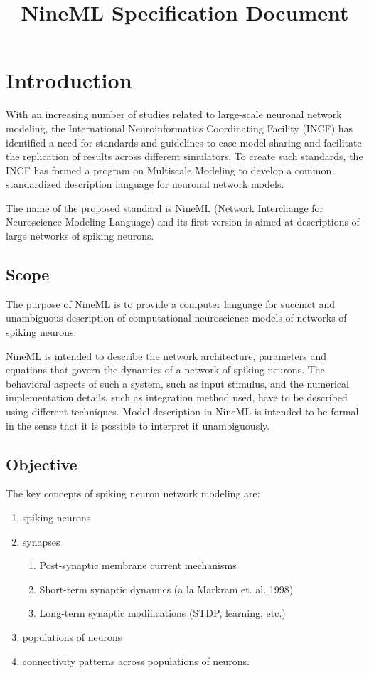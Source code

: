 \documentclass[a4paper]{article}
\begin{document}
\title{NineML Specification Document}

\newpage
\pagestyle{plain}

\tableofcontents

\section{Introduction}

With an increasing number of studies related to large-scale neuronal
network modeling, the International Neuroinformatics Coordinating
Facility (INCF) has identified a need for standards and guidelines to
ease model sharing and facilitate the replication of results across
different simulators. To create such standards, the INCF has formed a
program on Multiscale Modeling to develop a common standardized
description language for neuronal network models.

The name of the proposed standard is NineML (Network Interchange for
Neuroscience Modeling Language) and its first version is aimed at
descriptions of large networks of spiking neurons.

\subsection{Scope}

The purpose of NineML is to provide a computer language for
succinct and unambiguous description of computational neuroscience models of
networks of spiking neurons.

NineML is intended to describe the network architecture, parameters
and equations that govern the dynamics of a network of spiking
neurons. The behavioral aspects of such a system, such as input
stimulus, and the numerical implementation details, such as
integration method used, have to be described using different
techniques.  Model description in NineML is intended to be formal in
the sense that it is possible to interpret it unambiguously.

\subsection{Objective}

The key concepts of spiking neuron network modeling are:

\begin{enumerate}
\item spiking neurons
\item synapses 
\begin{enumerate}
\item Post-synaptic membrane current mechanisms
\item Short-term synaptic dynamics (a la Markram et. al. 1998)
\item Long-term synaptic modifications (STDP, learning, etc.)
\end{enumerate}
\item populations of neurons 
\item connectivity patterns across populations of neurons. 
\end{enumerate}
\end{document}
